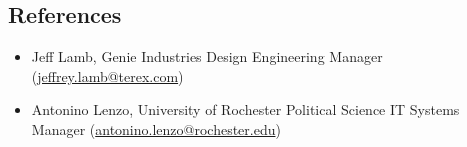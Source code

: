 \documentclass[10pt]{article}
\begin{document}
\subsection*{References}

\begin{itemize}
  \item Jeff Lamb, Genie Industries Design Engineering Manager (\href{mailto://jeffrey.lamb@terex.com}{jeffrey.lamb@terex.com})
	\item Antonino Lenzo, University of Rochester Political Science IT Systems Manager (\href{mailto://antonino.lenzo@rochester.edu}{antonino.lenzo@rochester.edu})
\end{itemize}
\end{document}
